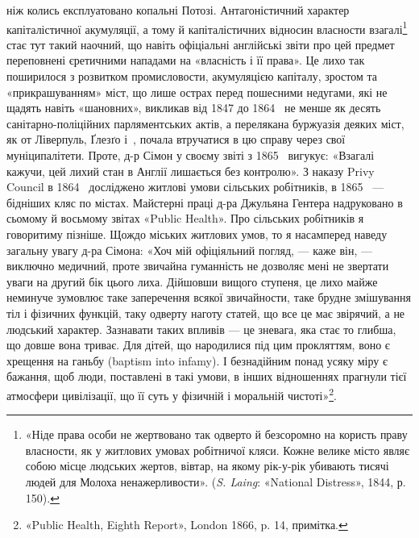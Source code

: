 \parcont{}  %
ніж колись експлуатовано копальні Потозі. Антагоністичний
характер капіталістичної акумуляції, а тому й капіталістичних
відносин власности взагалі\footnote{
«Ніде права особи не жертвовано так одверто й безсоромно на
користь праву власности, як у житлових умовах робітничої кляси. Кожне
велике місто являє собою місце людських жертов, вівтар, на якому рік-у-рік
убивають тисячі людей для Молоха ненажерливости». (\emph{S. Laing}:
«National Distress», 1844, р. 150).
} стає тут такий наочний, що навіть
офіціальні англійські звіти про цей предмет переповнені єретичними
нападами на «власність і її права». Це лихо так поширилося
з розвитком промисловости, акумуляцією капіталу, зростом
та «прикрашуванням» міст, що лише острах перед пошесними
недугами, які не щадять навіть «шановних», викликав від 1847
до 1864~ не менше як десять санітарно-поліційних парляментських
актів, а перелякана буржуазія деяких міст, як от Ліверпуль,
Ґлезґо і~, почала втручатися в цю справу через свої
муніципалітети. Проте, д-р Сімон у своєму звіті з 1865~ вигукує:
«Взагалі кажучи, цей лихий стан в Англії лишається без
контролю». З наказу Privy Council в 1864~ досліджено житлові
умови сільських робітників, в 1865~ — бідніших кляс по містах.
Майстерні праці д-ра Джульяна Гентера надруковано в
сьомому й восьмому звітах «Public Health». Про сільських робітників
я говоритиму пізніше. Щождо міських житлових умов,
то я насамперед наведу загальну увагу д-ра Сімона: «Хоч
мій офіціяльний погляд, — каже він, — виключно медичний, проте
звичайна гуманність не дозволяє мені не звертати уваги на другий
бік цього лиха. Дійшовши вищого ступеня, це лихо майже
неминуче зумовлює таке заперечення всякої звичайности, таке
брудне змішування тіл і фізичних функцій, таку одверту наготу
статей, що все це має звірячий, а не людський характер. Зазнавати
таких впливів — це зневага, яка стає то глибша, що довше
вона триває. Для дітей, що народилися під цим прокляттям,
воно є хрещення на ганьбу (baptism into infamy). І безнадійним
понад усяку міру є бажання, щоб люди, поставлені в такі умови,
в інших відношеннях прагнули тієї атмосфери цивілізації, що її
суть у фізичній і моральній чистоті»\footnote{
«Public Health, Eighth Report», London 1866, p. 14, примітка.
}.

